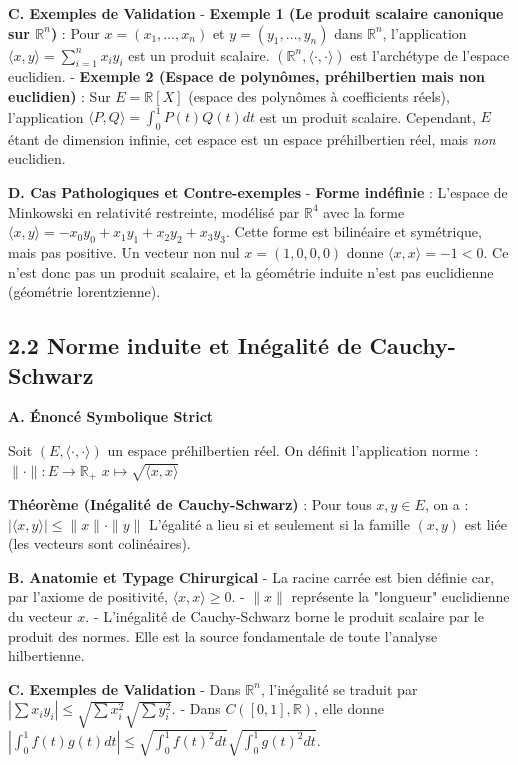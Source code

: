 \documentclass{report}
\begin{document}
\textbf{C. Exemples de Validation}
- \textbf{Exemple 1 (Le produit scalaire canonique sur $\mathbb{R}^n$)} :
  Pour $x = (x_1, \ldots, x_n)$ et $y = (y_1, \ldots, y_n)$ dans $\mathbb{R}^n$, l'application $\langle x, y \rangle = \sum_{i=1}^n x_i y_i$ est un produit scalaire. $(\mathbb{R}^n, \langle \cdot, \cdot \rangle)$ est l'archétype de l'espace euclidien.
- \textbf{Exemple 2 (Espace de polynômes, préhilbertien mais non euclidien)} :
  Sur $E = \mathbb{R}[X]$ (espace des polynômes à coefficients réels), l'application $\langle P, Q \rangle = \int_0^1 P(t)Q(t)dt$ est un produit scalaire. Cependant, $E$ étant de dimension infinie, cet espace est un espace préhilbertien réel, mais \textit{non} euclidien.

\textbf{D. Cas Pathologiques et Contre-exemples}
- \textbf{Forme indéfinie} : L'espace de Minkowski en relativité restreinte, modélisé par $\mathbb{R}^4$ avec la forme $\langle x, y \rangle = -x_0 y_0 + x_1 y_1 + x_2 y_2 + x_3 y_3$. Cette forme est bilinéaire et symétrique, mais pas positive. Un vecteur non nul $x = (1, 0, 0, 0)$ donne $\langle x, x \rangle = -1 < 0$. Ce n'est donc pas un produit scalaire, et la géométrie induite n'est pas euclidienne (géométrie lorentzienne).

\subsection*{2.2 Norme induite et Inégalité de Cauchy-Schwarz}

\textbf{A. Énoncé Symbolique Strict}

Soit $(E, \langle \cdot, \cdot \rangle)$ un espace préhilbertien réel. On définit l'application norme :
$ \|\cdot\| : E \to \mathbb{R}_+ $
$ x \mapsto \sqrt{\langle x, x \rangle} $

\textbf{Théorème (Inégalité de Cauchy-Schwarz)} :
Pour tous $x, y \in E$, on a :
$ |\langle x, y \rangle| \le \|x\| \cdot \|y\| $
L'égalité a lieu si et seulement si la famille $(x, y)$ est liée (les vecteurs sont colinéaires).

\textbf{B. Anatomie et Typage Chirurgical}
- La racine carrée est bien définie car, par l'axiome de positivité, $\langle x, x \rangle \ge 0$.
- $\|x\|$ représente la "longueur" euclidienne du vecteur $x$.
- L'inégalité de Cauchy-Schwarz borne le produit scalaire par le produit des normes. Elle est la source fondamentale de toute l'analyse hilbertienne.

\textbf{C. Exemples de Validation}
- Dans $\mathbb{R}^n$, l'inégalité se traduit par $|\sum x_i y_i| \le \sqrt{\sum x_i^2} \sqrt{\sum y_i^2}$.
- Dans $C([0,1], \mathbb{R})$, elle donne $|\int_0^1 f(t)g(t)dt| \le \sqrt{\int_0^1 f(t)^2 dt} \sqrt{\int_0^1 g(t)^2 dt}$.
\end{document}
